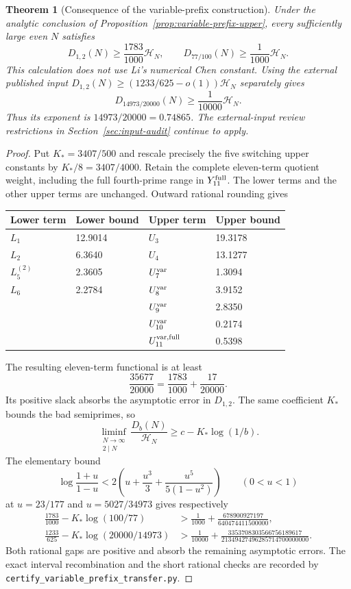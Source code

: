 \documentclass[11pt]{article}
\newtheorem{theorem}{Theorem}
\newcommand{\HN}{\mathcal H_N}
\begin{document}
\begin{theorem}[Consequence of the variable-prefix construction]
\label{thm:variable-prefix-chen}
Under the analytic conclusion of
Proposition~\ref{prop:variable-prefix-upper}, every sufficiently
large even $N$ satisfies
\[
 D_{1,2}(N)\ge\frac{1783}{1000}\HN,
 \qquad D_{77/100}(N)\ge\frac1{1000}\HN.
\]
This calculation does not use Li's numerical Chen constant.
Using the external published input
$D_{1,2}(N)\ge(1233/625-o(1))\HN$ separately gives
\[
 D_{14973/20000}(N)\ge\frac1{10000}\HN.
\]
Thus its exponent is $14973/20000=0.74865$.
The external-input review restrictions in
Section~\ref{sec:input-audit} continue to apply.
\end{theorem}

\begin{proof}
Put $K_*=3407/500$ and rescale precisely the five switching
upper constants by $K_*/8=3407/4000$. Retain the complete
eleven-term quotient weight, including the full fourth-prime
range in $Y_{11}^{\rm full}$. The lower terms and the other
upper terms are unchanged. Outward rational rounding gives
\begin{center}
\begin{tabular}{ll@{\qquad}ll}
\toprule
Lower term&Lower bound&Upper term&Upper bound\\
\midrule
$L_1$&12.9014&$U_3$&19.3178\\
$L_2$&6.3640&$U_4$&13.1277\\
$L_5^{(2)}$&2.3605&$U_7^{\rm var}$&1.3094\\
$L_6$&2.2784&$U_8^{\rm var}$&3.9152\\
&&$U_9^{\rm var}$&2.8350\\
&&$U_{10}^{\rm var}$&0.2174\\
&&$U_{11}^{{\rm var},{\rm full}}$&0.5398\\
\bottomrule
\end{tabular}
\end{center}
The resulting eleven-term functional is at least
\[
 \frac{35677}{20000}
 =\frac{1783}{1000}+\frac{17}{20000}.
\]
Its positive slack absorbs the asymptotic error in $D_{1,2}$.
The same coefficient $K_*$ bounds the bad semiprimes, so
\[
 \liminf_{\substack{N\to\infty\\2\mid N}}
 \frac{D_b(N)}{\HN}\ge c-K_*\log(1/b).
\]
The elementary bound
\[
 \log\frac{1+u}{1-u}
 <2\left(u+\frac{u^3}{3}+\frac{u^5}{5(1-u^2)}\right)
 \qquad(0<u<1)
\]
at $u=23/177$ and $u=5027/34973$ gives respectively
\begin{align*}
 \frac{1783}{1000}-K_*\log(100/77)
 &>\frac1{1000}+\frac{678900927197}{640474411500000},\\
 \frac{1233}{625}-K_*\log(20000/14973)
 &>\frac1{10000}
    +\frac{3353708303566756189617}{21349427496285714700000000}.
\end{align*}
Both rational gaps are positive and absorb the remaining
asymptotic errors. The exact interval recombination and the
short rational checks are recorded by
\texttt{certify\_variable\_prefix\_transfer.py}.
\end{proof}
\end{document}
